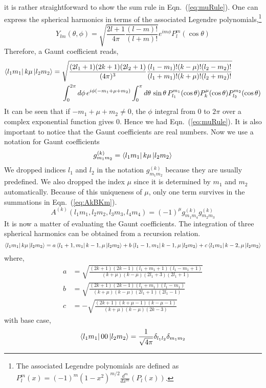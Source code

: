 it is rather straightforward to show the sum rule in Eqn.~(\ref{eq:muRule}).
One can express the spherical harmonics in terms of the associated Legendre
polynomials,\footnote{The associated Legendre polynomials are defined as
$P_l^m(x) = (-1)^m (1-x^2)^{m/2} \frac{d^m}{dx^m}(P_l(x))$.}
\begin{equation} \label{eq:spha}
Y_{lm}(\theta,\phi) = \sqrt{\frac{2l+1}{4\pi}\frac{(l-m)!}{(l+m)!}} e^{im\phi} P_l^m(\cos{\theta})
\end{equation}
Therefore, a Gaunt coefficient reads,
\begin{align} \label{eq:muRuleShow}
\Bra{l_1m_1} k\mu \Ket{l_2m_2} =
{} & \sqrt{\frac{(2l_1+1)(2k+1)(2l_2+1)}{(4\pi)^3}
\frac{(l_1-m_1)!(k-\mu)!(l_2-m_2)!}{(l_1+m_1)!(k+\mu)!(l_2+m_2)!}} \nonumber \\
& \int_0^{2\pi}d\phi\, e^{i\phi(-m_1+\mu+m_2)}
\int_0^{\pi}d\theta\,\sin{\theta}\,
P_{l_1}^{m_1}(\cos{\theta}) P_k^\mu(\cos{\theta}) P_{l_2}^{m_2}(\cos{\theta})
\end{align}
It can be seen that if $-m_1+\mu+m_2 \ne 0$, the $\phi$ integral from 0 to
$2\pi$ over a complex exponential function gives 0. Hence we had Eqn.~(\ref{eq:muRule}).
It is also important to notice that the Gaunt coefficients are real numbers.
Now we use a notation for Gaunt coefficients
\begin{equation} \label{eq:gnt}
g_{m_1m_2}^{(k)} = \Bra{l_1m_1} k\mu \Ket{l_2m_2}
\end{equation}
We dropped indices $l_1$ and $l_2$ in the notation $g_{m_1m_2}^{(k)}$
because they are usually predefined.
We also dropped the index $\mu$ since it is determined by $m_1$ and $m_2$
automatically. Because of this uniqueness of $\mu$, only one term
survives in the summations in Eqn.~(\ref{eq:AkBKm}).
\begin{equation} \label{eq:AkBKone}
\boxed{A^{(k)}(l_1m_1,l_2m_2,l_3m_3,l_4m_4) = (-1)^{\mu} g_{m_1m_4}^{(k)} g_{m_2m_3}^{(k)}}
\end{equation}
%
It is now a matter of evaluating the Gaunt coefficients. The integration of
three spherical harmonics can be obtained from a recursion relation.
\begin{equation} \label{eq:GauntRec}
\Bra{l_1m_1} k\mu \Ket{l_2m_2} = a \Bra{l_1+1,m_1} k-1,\mu \Ket{l_2m_2}
+ b \Bra{l_1-1,m_1} k-1,\mu \Ket{l_2m_2}
+ c \Bra{l_1m_1} k-2,\mu \Ket{l_2m_2}
\end{equation}
where,
\begin{align}
a & = \sqrt{\frac{(2k+1)(2k-1)(l_1+m_1+1)(l_1-m_1+1)}{(k+\mu)(k-\mu)(2l_1+3)(2l_1+1)}} \label{eq:afact} \\
b & = \sqrt{\frac{(2k+1)(2k-1)(l_1+m_1)(l_1-m_1)}{(k+\mu)(k-\mu)(2l_1+1)(2l_1-1)}} \label{eq:bfact} \\
c & = -\sqrt{\frac{(2k+1)(k+\mu-1)(k-\mu-1)}{(k+\mu)(k-\mu)(2k-3)}} \label{eq:cfact}
\end{align}
with base case,
\begin{equation} \label{eq:GauntBase}
\Bra{l_1m_1} 00 \Ket{l_2m_2} = \frac{1}{\sqrt{4\pi}} \delta_{l_1l_2} \delta_{m_1m_2}
\end{equation}

